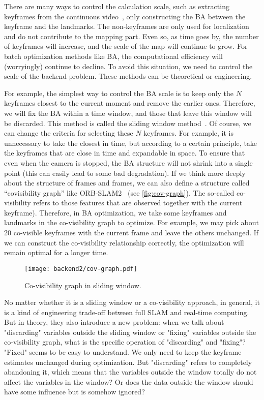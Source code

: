 There are many ways to control the calculation scale, such as extracting keyframes from the continuous video~\cite{Leutenegger2015}, only constructing the BA between the keyframe and the landmarks. The non-keyframes are only used for localization and do not contribute to the mapping part. Even so, as time goes by, the number of keyframes will increase, and the scale of the map will continue to grow. For batch optimization methods like BA, the computational efficiency will (worryingly) continue to decline. To avoid this situation, we need to control the scale of the backend problem. These methods can be theoretical or engineering.

For example, the simplest way to control the BA scale is to keep only the $N$ keyframes closest to the current moment and remove the earlier ones. Therefore, we will fix the BA within a time window, and those that leave this window will be discarded. This method is called the sliding window method~\cite{Sibley2008}. Of course, we can change the criteria for selecting these $N$ keyframes. For example, it is unnecessary to take the closest in time, but according to a certain principle, take the keyframes that are close in time and expandable in space. To ensure that even when the camera is stopped, the BA structure will not shrink into a single point (this can easily lead to some bad degradation). If we think more deeply about the structure of frames and frames, we can also define a structure called ``covisibility graph'' like ORB-SLAM2~\cite{Mur-Artal2015} (see \autoref{fig:cov-graph}). The so-called co-visibility refers to those features that are observed together with the current keyframe). Therefore, in BA optimization, we take some keyframes and landmarks in the co-visibility graph to optimize. For example, we may pick about 20 co-visible keyframes with the current frame and leave the others unchanged. If we can construct the co-visibility relationship correctly, the optimization will remain optimal for a longer time.

\begin{figure}[!ht]
	\centering
	\texttt{[image: backend2/cov-graph.pdf]}
	\caption{Co-visibility graph in sliding window. }
	\label{fig:cov-graph}
\end{figure}

No matter whether it is a sliding window or a co-visibility approach, in general, it is a kind of engineering trade-off between full SLAM and real-time computing. But in theory, they also introduce a new problem: when we talk about "discarding" variables outside the sliding window or "fixing" variables outside the co-visibility graph, what is the specific operation of "discarding" and "fixing"? "Fixed" seems to be easy to understand. We only need to keep the keyframe estimates unchanged during optimization. But "discarding" refers to completely abandoning it, which means that the variables outside the window totally do not affect the variables in the window?  Or does the data outside the window should have some influence but is somehow ignored? 

